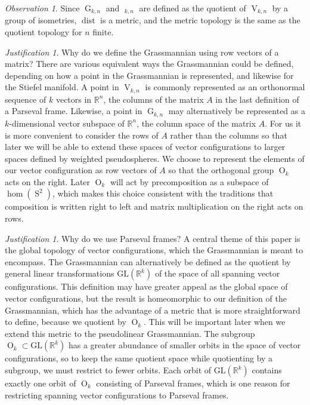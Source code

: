 \documentclass[JEP,XML,SOM,Unicode,NoFloatCountersInSection,published]{cedram}
\theoremstyle{remark}
\newtheorem{observation}[theorem]{Observation}
\newtheorem{justification}[theorem]{Justification}
\let\mb\mathbb
\DeclareMathOperator{\dist}{dist}
\DeclareMathOperator{\g}{G}
\DeclareMathOperator{\oG}{\widetilde G}
\DeclareMathOperator{\orth}{O}
\DeclareMathOperator{\stief}{V}
\DeclareMathOperator{\sphere}{S}
\begin{document}
\begin{observation}
Since $\g_{k,n}$ and $\oG_{k,n}$ are defined as the quotient of $\stief_{k,n}$ by a group of isometries, $\dist$ is a metric, and the metric topology is the same as the quotient topology for $n$ finite.
\end{observation}

\begin{justification}
Why do we define the Grassmannian using row vectors of a matrix?
There are various equivalent ways the Grassmannian could be defined, depen\-ding on how a point in the Grassmannian is represented, and likewise for the Stiefel manifold.
A point in $\stief_{k,n}$ is commonly represented as an orthonormal sequence of $k$ vectors in $\mb{R}^n$, \ie the columns of the matrix $A$ in the last definition of a Parseval frame.
Likewise, a point in $\g_{k,n}$ may alternatively be represented as a $k$-dimensional vector subspace of $\mb{R}^n$, \ie the column space of the matrix $A$.
For us it is more convenient to consider the rows of $A$ rather than the columns so that later we will be able to extend these spaces of vector configurations to larger spaces defined by weighted pseudospheres.
We choose to represent the elements of our vector configuration as row vectors of $A$ so that the orthogonal group $\orth_k$ acts on the right. Later $\orth_k$ will act by precomposition as a subspace of $\hom(\sphere^2)$, which makes this choice consistent with the traditions that composition is written right to left and matrix multiplication on the right acts on rows.
\end{justification}

\begin{justification}
Why do we use Parseval frames?
A central theme of this paper is the global topology of vector configurations, which the Grassmannian is meant to encompass.
The Grassmannian can alternatively be defined as the quotient by general linear transformations $\mathrm{GL}(\mb{R}^k)$ of the space of all spanning vector configurations. This definition may have greater appeal as the global space of vector configurations, but the result is homeomorphic to our definition of the Grassmannian, which has the advantage of a metric that is more straightforward to define, because we quotient by $\orth_k$. This will be important later when we extend this metric to the pseudolinear Grassmannian.
The subgroup $\orth_k \subset \mathrm{GL}(\mb{R}^k)$ has a greater abundance of smaller orbits in the space of vector configurations, so to keep the same quotient space while quotienting by a subgroup, we must restrict to fewer orbits.
Each orbit of $\mathrm{GL}(\mb{R}^k)$ contains exactly one orbit of $\orth_k$ consisting of Parseval frames, which is one reason for restricting spanning vector configurations to Parseval frames.
\end{justification}
\end{document}
